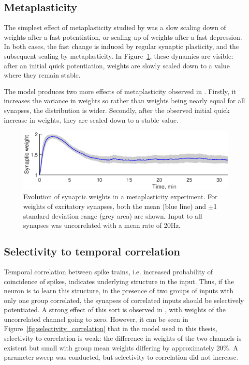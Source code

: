 \documentclass[a4paper,12pt]{report}
\theoremstyle{definition}
\begin{document}
\subsection{Metaplasticity}

The simplest effect of metaplasticity studied by \cite{yeung2004synaptic} was a slow scaling down of weights after a fast potentiation, or scaling up of weights after a fast depression. In both cases, the fast change is induced by regular synaptic plasticity, and the subsequent scaling by metaplasticity. In Figure~\ref{fig:valid_metaplasticity_evolution}, these dynamics are visible: after an initial quick potentiation, weights are slowly scaled down to a value where they remain stable.

The model produces two more effects of metaplasticity observed in \cite{yeung2004synaptic}. Firstly, it increases the variance in weights so rather than weights being nearly equal for all synapses, the distribution is wider. Secondly, after the observed initial quick increase in weights, they are scaled down to a stable value.

\begin{figure}[h]
    \includegraphics[width=\textwidth]{figures/valid_metaplasticity_evolution.eps}
    \caption{Evolution of synaptic weights in a metaplasticity experiment. For weights of excitatory synapses, both the mean (blue line) and $\pm$1 standard deviation range (grey area) are shown. Input to all synapses was uncorrelated with a mean rate of 20Hz.}
    \label{fig:valid_metaplasticity_evolution}
\end{figure}




\subsection{Selectivity to temporal correlation} %
\label{subsec:selectivitycorrelation}

Temporal correlation between spike trains, i.e. increased probability of coincidence of spikes, indicates underlying structure in the input. Thus, if the neuron is to learn this structure, in the presence of two groups of inputs with only one group correlated, the synapses of correlated inputs should be selectively potentiated. A strong effect of this sort is observed in \cite{yeung2004synaptic}, with weights of the uncorrelated channel going to zero. However, it can be seen in Figure~\ref{fig:selectivity_correlation} that in the model used in this thesis, selectivity to correlation is weak: the difference in weights of the two channels is existent but small with group mean weights differing by approximately 20\%. A parameter sweep was conducted, but selectivity to correlation did not increase.
\end{document}

